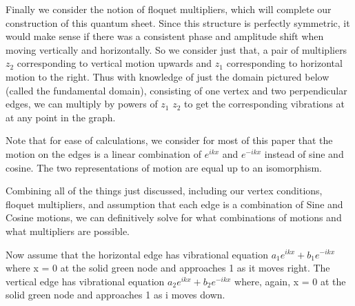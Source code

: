 \documentclass[12pt]{article}
\begin{document}
Finally we consider the notion of floquet multipliers, which will complete our construction of this quantum sheet. Since this structure is perfectly symmetric, it would make sense if there was a consistent phase and amplitude shift when moving vertically and horizontally. So we consider just that, a pair of multipliers  $z_2$ corresponding to vertical motion upwards and $z_1$ corresponding to horizontal motion to the right. Thus with knowledge of just the domain pictured below (called the fundamental domain), consisting of one vertex and two perpendicular edges, we can multiply by powers of $z_1$ $z_2$ to get the corresponding vibrations at at any point in the graph.

\centerline{}

Note that for ease of  calculations, we consider for most of this paper that the motion on the edges is a linear combination of $e^{ikx}$ and $e^{-ikx}$ instead of sine and cosine. The two representations of motion are equal up to an isomorphism. 

Combining all of the things just discussed, including our vertex conditions, floquet multipliers, and assumption that each edge is a combination of Sine and Cosine motions, we can definitively solve for what combinations of motions and what multipliers are possible.

Now assume that the horizontal edge has vibrational equation $a_1e^{ikx} + b_1e^{-ikx}$ where x = 0 at the solid green node and approaches 1 as it moves right. The vertical edge has vibrational equation $a_2e^{ikx} + b_2e^{-ikx}$ where, again, x = 0 at the solid green node and approaches 1 as i moves down.
 
\end{document}
